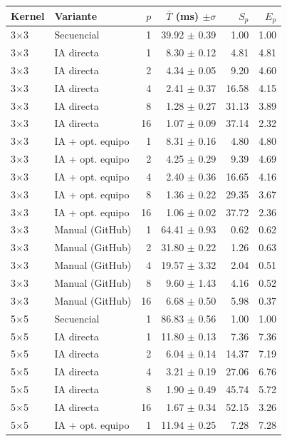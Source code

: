 \begin{tabular}{llrrrr}
\toprule
Kernel & Variante & $p$ & $\bar{T}$ (ms) $\pm\sigma$ & $S_p$ & $E_p$ \\
\midrule
3$\times$3 & Secuencial & 1 & 39.92 $\pm$ 0.39 & 1.00 & 1.00 \\
3$\times$3 & IA directa & 1 & 8.30 $\pm$ 0.12 & 4.81 & 4.81 \\
3$\times$3 & IA directa & 2 & 4.34 $\pm$ 0.05 & 9.20 & 4.60 \\
3$\times$3 & IA directa & 4 & 2.41 $\pm$ 0.37 & 16.58 & 4.15 \\
3$\times$3 & IA directa & 8 & 1.28 $\pm$ 0.27 & 31.13 & 3.89 \\
3$\times$3 & IA directa & 16 & 1.07 $\pm$ 0.09 & 37.14 & 2.32 \\
3$\times$3 & IA + opt. equipo & 1 & 8.31 $\pm$ 0.16 & 4.80 & 4.80 \\
3$\times$3 & IA + opt. equipo & 2 & 4.25 $\pm$ 0.29 & 9.39 & 4.69 \\
3$\times$3 & IA + opt. equipo & 4 & 2.40 $\pm$ 0.36 & 16.65 & 4.16 \\
3$\times$3 & IA + opt. equipo & 8 & 1.36 $\pm$ 0.22 & 29.35 & 3.67 \\
3$\times$3 & IA + opt. equipo & 16 & 1.06 $\pm$ 0.02 & 37.72 & 2.36 \\
3$\times$3 & Manual (GitHub) & 1 & 64.41 $\pm$ 0.93 & 0.62 & 0.62 \\
3$\times$3 & Manual (GitHub) & 2 & 31.80 $\pm$ 0.22 & 1.26 & 0.63 \\
3$\times$3 & Manual (GitHub) & 4 & 19.57 $\pm$ 3.32 & 2.04 & 0.51 \\
3$\times$3 & Manual (GitHub) & 8 & 9.60 $\pm$ 1.43 & 4.16 & 0.52 \\
3$\times$3 & Manual (GitHub) & 16 & 6.68 $\pm$ 0.50 & 5.98 & 0.37 \\
\midrule
5$\times$5 & Secuencial & 1 & 86.83 $\pm$ 0.56 & 1.00 & 1.00 \\
5$\times$5 & IA directa & 1 & 11.80 $\pm$ 0.13 & 7.36 & 7.36 \\
5$\times$5 & IA directa & 2 & 6.04 $\pm$ 0.14 & 14.37 & 7.19 \\
5$\times$5 & IA directa & 4 & 3.21 $\pm$ 0.19 & 27.06 & 6.76 \\
5$\times$5 & IA directa & 8 & 1.90 $\pm$ 0.49 & 45.74 & 5.72 \\
5$\times$5 & IA directa & 16 & 1.67 $\pm$ 0.34 & 52.15 & 3.26 \\
5$\times$5 & IA + opt. equipo & 1 & 11.94 $\pm$ 0.25 & 7.28 & 7.28 \\

\end{tabular}

